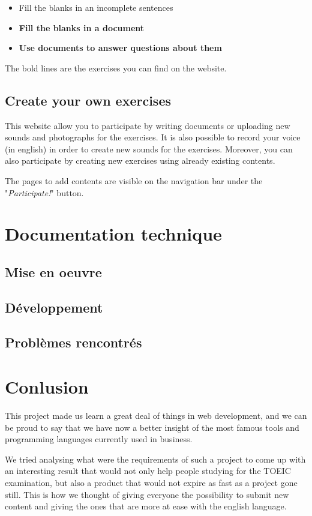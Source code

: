 \documentclass[12pt,a4paper]{report}
\begin{document}
\begin{itemize}
\item Fill the blanks in an incomplete sentences
\item \textbf{Fill the blanks in a document}
\item \textbf{Use documents to answer questions about them}
\end{itemize}

The bold lines are the exercises you can find on the website.

\subsection{Create your own exercises}

This website allow you to participate by writing documents or uploading new
sounds and photographs for the exercises. It is also possible to record your
voice (in english) in order to create new sounds for the exercises. Moreover,
you can also participate by creating new exercises using already existing
contents.

The pages to add contents are visible on the navigation bar
under the "\textit{Participate!}" button.

\pagebreak

\section{Documentation technique}
\subsection{Mise en oeuvre}

\subsection{Développement}
\subsection{Problèmes rencontrés}


\section*{Conlusion}
This project made us learn a great deal of things in web development, and we
can be proud to say that we have now a better insight of the most famous tools
and programming languages currently used in business.
 
We tried analysing what were the requirements of such a project to come up with
an interesting result that would not only help people studying for the TOEIC
examination, but also a product that would not expire as fast as a project gone
still. This is how we thought of giving everyone the possibility to submit new
content and giving the ones that are more at ease with the english language.


\end{document}
